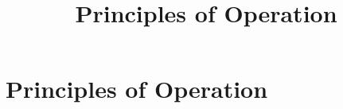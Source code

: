 \documentclass[../../OAE-SPEC-MAIN.tex]{subfiles}
\title{Principles of Operation}\label{sec:principles-of-operation}
\begin{document}
\chapter{Principles of Operation}
















\end{document}
